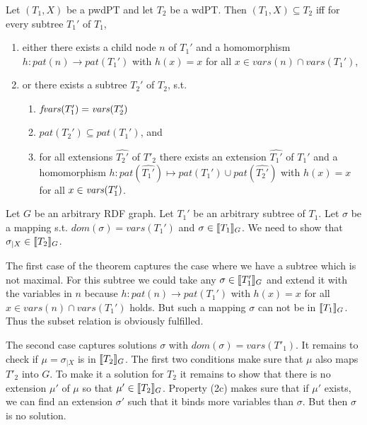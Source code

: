 \begin{theorem}\label{projwd}\cite{pichler2014containment}
	Let $(T_1,X)$ be a pwdPT and let $T_2$ be a wdPT. Then $(T_1,X) \subseteq
	T_2$ iff for every subtree $T_1'$ of $T_1$,
	\begin{enumerate}
		\item either there exists a child node $n$ of $T_1'$ and a homomorphism
			$h:pat(n) \rightarrow pat(T_1')$ with $h(x) = x$ for all $x \in
			vars(n) \cap vars(T_1')$,
		\item or there exists a subtree $T_2'$ of $T_2$, s.t.
			\begin{enumerate}
				\item $\mathit{fvars}(T_1') = \mathit{vars}(T_2')$
				\item $pat(T_2') \subseteq pat(T_1')$, and
				\item for all extensions $\hat{T_2'}$ of $T'_2$ there exists an
					extension $\hat{T_1'}$ of $T_1'$ and a homomorphism 
					$h: pat(\hat{T_1'}) \mapsto pat(T_1') \cup pat(\hat{T_2'})$
					with $h(x) = x$ for all $x \in \mathit{vars} (T_1')$.
			\end{enumerate}
	\end{enumerate}
\end{theorem}
\begin{proofidea}
Let $G$ be an arbitrary RDF graph. Let $T_1'$ be an arbitrary subtree
of $T_1$. Let $\sigma$ be a mapping s.t. $dom(\sigma) = vars(T_1')$ and $\sigma
\in \llbracket T_1 \rrbracket_G$. We need to show that $\sigma_{|X} \in \llbracket T_2 \rrbracket_G$.

The first case of the theorem captures the case where we have a subtree which is
not maximal. For this subtree we could take any $\sigma
\in \llbracket T_1' \rrbracket_G$ and extend it with the variables in $n$ because  
$h:pat(n) \rightarrow pat(T_1')$ with $h(x) = x$ for all $x \in
vars(n) \cap vars(T_1')$ holds. But such a mapping $\sigma$ can not be in $\llbracket
T_1 \rrbracket_G$. Thus the subset relation is obviously fulfilled.

The second case captures solutions $\sigma$ with $dom(\sigma) = vars(T'_1)$.
It remains to check if $\mu = \sigma_{|X}$ is in $\llbracket T_2\rrbracket_G$.
The first two conditions make sure that $\mu$ also maps $T'_2$ into $G$. To make
it a solution for $T_2$ it remains to show that there is no extension $\mu'$ of $\mu$
so that $\mu' \in \llbracket T_2\rrbracket_G$. Property (2c) makes sure that if $\mu'$ exists,
we can find an extension $\sigma'$ such that it binds more variables than
$\sigma$. But then $\sigma$ is no solution.
\end{proofidea}

